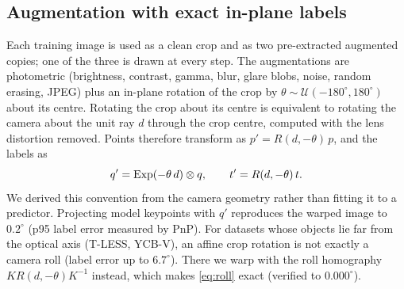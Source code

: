 \subsection{Augmentation with exact in-plane labels}
\label{sec:aug}
Each training image is used as a clean crop and as two pre-extracted augmented copies; one of the three is drawn at every step. The augmentations are photometric (brightness, contrast, gamma, blur, glare blobs, noise, random erasing, JPEG) plus an in-plane rotation of the crop by $\theta\sim\mathcal{U}(-180^\circ,180^\circ)$ about its centre.
Rotating the crop about its centre is equivalent to rotating the camera about the unit ray $d$ through the crop centre, computed with the lens distortion removed. Points therefore transform as $p'=R(d,-\theta)\,p$, and the labels as
\begin{equation}
  q' = \mathrm{Exp}(-\theta\, d)\otimes q,\qquad t'=R(d,-\theta)\,t .
  \label{eq:roll}
\end{equation}
We derived this convention from the camera geometry rather than fitting it to a predictor. Projecting model keypoints with $q'$ reproduces the warped image to $0.2^\circ$ (p95 label error measured by PnP). For datasets whose objects lie far from the optical axis (T-LESS, YCB-V), an affine crop rotation is not exactly a camera roll (label error up to $6.7^\circ$). There we warp with the roll homography $K R(d,-\theta) K^{-1}$ instead, which makes \cref{eq:roll} exact (verified to $0.000^\circ$).

